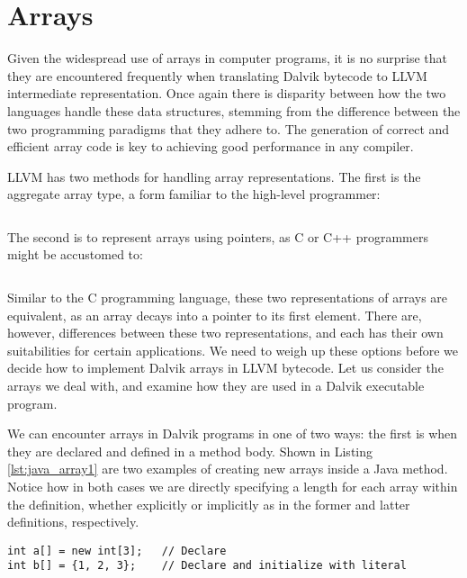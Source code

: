 \section{Arrays}
\label{sec:arrays}

Given the widespread use of arrays in computer programs, it is no surprise that they are encountered frequently when translating Dalvik bytecode to LLVM intermediate representation. Once again there is disparity between how the two languages handle these data structures, stemming from the difference between the two programming paradigms that they adhere to. The generation of correct and efficient array code is key to achieving good performance in any compiler.

LLVM has two methods for handling array representations. The first is the aggregate array type, a form familiar to the high-level programmer:

\lstset{
	language=Assembly,
	basicstyle=\small,
	stringstyle=\ttfamily
}
\begin{lstlisting}[frame=single]
%array = [<# elements> x <element type>]
\end{lstlisting}

The second is to represent arrays using pointers, as C or C++ programmers might be accustomed to:

\begin{lstlisting}[frame=single]
%array = <element type>*
\end{lstlisting}

Similar to the C programming language, these two representations of arrays are equivalent, as an array decays into a pointer to its first element. There are, however, differences between these two representations, and each has their own suitabilities for certain applications. We need to weigh up these options before we decide how to implement Dalvik arrays in LLVM bytecode. Let us consider the arrays we deal with, and examine how they are used in a Dalvik executable program.

We can encounter arrays in Dalvik programs in one of two ways: the first is when they are declared and defined in a method body. Shown in Listing \ref{lst:java_array1} are two examples of creating new arrays inside a Java method. Notice how in both cases we are directly specifying a length for each array within the definition, whether explicitly or implicitly as in the former and latter definitions, respectively.

\lstset{
	language=Java,
	basicstyle=\small,
	stringstyle=\ttfamily
}
\begin{lstlisting}[frame=single, caption={Arrays in Java}, label={lst:java_array1}]
int a[] = new int[3];   // Declare
int b[] = {1, 2, 3};    // Declare and initialize with literal
\end{lstlisting}

